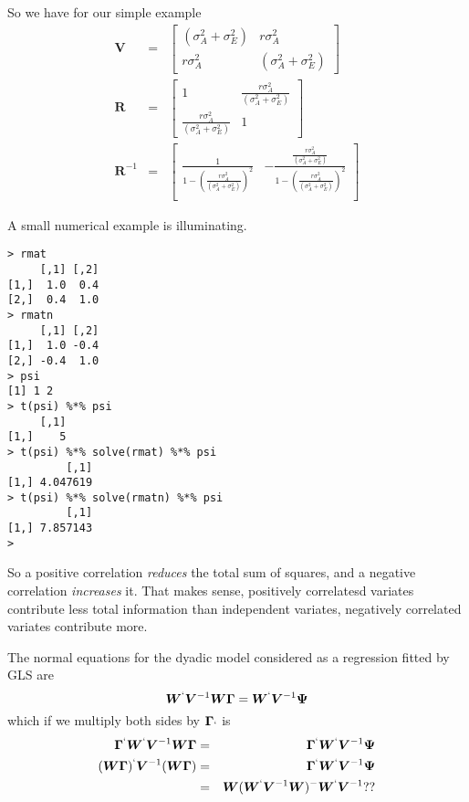 \documentclass[titlepage]{article}  %
\begin{document}
So we have for our simple example
\begin{eqnarray*}
\bm{V} & = & \begin{bmatrix} (\sigma^{2}_{A} + \sigma^{2}_{E}) & r \sigma^{2}_{A} \\ r \sigma^{2}_{A} & (\sigma^{2}_{A} + \sigma^{2}_{E}) \end{bmatrix} \\
\bm{R} & = & \begin{bmatrix} 1 & \frac{r \sigma^{2}_{A}}{(\sigma^{2}_{A} + \sigma^{2}_{E})} \\ \frac{r \sigma^{2}_{A}}{(\sigma^{2}_{A} + \sigma^{2}_{E})} & 1 \end{bmatrix} \\
\bm{R}^{-1} & = & \begin{bmatrix} \frac{1}{1 - (\frac{r \sigma^{2}_{A}}{(\sigma^{2}_{A} + \sigma^{2}_{E})})^{2}}  & - \frac{\frac{r \sigma^{2}_{A}}{(\sigma^{2}_{A} + \sigma^{2}_{E})}}{1 - (\frac{r \sigma^{2}_{A}}{(\sigma^{2}_{A} + \sigma^{2}_{E})})^{2}} \\ &  \end{bmatrix}
\end{eqnarray*}

A small numerical example is illuminating. 
\begin{verbatim}
> rmat
     [,1] [,2]
[1,]  1.0  0.4
[2,]  0.4  1.0
> rmatn
     [,1] [,2]
[1,]  1.0 -0.4
[2,] -0.4  1.0
> psi
[1] 1 2
> t(psi) %*% psi
     [,1]
[1,]    5
> t(psi) %*% solve(rmat) %*% psi
         [,1]
[1,] 4.047619
> t(psi) %*% solve(rmatn) %*% psi
         [,1]
[1,] 7.857143
> 
\end{verbatim}
So a positive correlation {\em reduces} the total sum of squares, and a negative correlation {\em increases} it. That makes sense, positively correlatesd variates contribute less total information than independent variates, negatively correlated variates contribute more.

The normal equations for the dyadic model considered as a regression fitted by GLS are
\begin{displaymath}
\bm{W}^{`} \bm{V}^{-1} \bm{W} \bm{\Gamma} = \bm{W}^{`} \bm{V}^{-1} \bm{\Psi}
\end{displaymath}
which if we multiply both sides by $\bm{\Gamma}_{`}$ is
\begin{eqnarray*}
\bm{\Gamma}^{`} \bm{W}^{`} \bm{V}^{-1} \bm{W} \bm{\Gamma} & = & \bm{\Gamma}^{`} \bm{W}^{`} \bm{V}^{-1} \bm{\Psi}  \\
(\bm{W}\bm{\Gamma})^{`} \bm{V}^{-1} (\bm{W}\bm{\Gamma}) & = & \bm{\Gamma}^{`} \bm{W}^{`} \bm{V}^{-1} \bm{\Psi} \\
& = & \bm{W}(\bm{W}^{`} \bm{V}^{-1} \bm{W})^{-}\bm{W}^{`} \bm{V}^{-1} ??
\end{eqnarray*}
\end{document}
